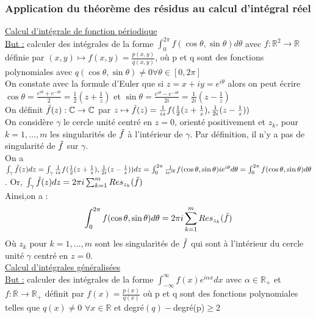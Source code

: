 \documentclass[../main.tex]{subfiles}
\begin{document}
\subsubsection{Application du théorème des résidus au calcul d'intégral réel}
\quad \underline{Calcul d'intégrale de fonction périodique}\\
\underline{But :} calculer des intégrales de la forme $\int_0^{2\pi} f(\cos{\theta}, \sin{\theta})d\theta$ avec $f:\mathbb{R}^2 \rightarrow \mathbb{R}$ définie par $(x,y) \mapsto f(x,y) = \frac{p(x,y)}{q(x,y)}$, où p et q sont des fonctions polynomiales avec $q(\cos{\theta}, \sin{\theta}) \neq 0 \forall \theta \in [0,2\pi]$\\

On constate avec la formule d'Euler que si $z= x+iy = e^{i\theta}$ alors on peut écrire $\cos{\theta} = \frac{e^{i\theta} + e^{-i\theta}}{2} = \frac{1}{2}(z+\frac{1}{z})$ et $\sin{\theta} = \frac{e^{i\theta} - e^{-i\theta}}{2i} = \frac{1}{2i}(z-\frac{1}{z})$\\
On définit $\Tilde{f}(z) : \mathbb{C} \rightarrow \mathbb{C}$ par $z\mapsto \Tilde{f}(z) = \frac{1}{iz} f(\frac{1}{2}(z+\frac{1}{z}), \frac{1}{2i}(z-\frac{1}{z}))$\\
On considère $\gamma$ le cercle unité centré en $z=0$, orienté positivement et $z_k$, pour $k=1,\dots, m$ les singularités de $\Tilde{f}$ à l'intérieur de $\gamma$. Par définition, il n'y a pas de singularité de $\Tilde{f}$ sur $\gamma$.\\

On a $\int_\gamma \Tilde{f}(z)dz = \int_\gamma \frac{1}{iz} f(\frac{1}{2}(z+\frac{1}{z}), \frac{1}{2i}(z-\frac{1}{z}))dz = \int_0^{2\pi} \frac{1}{ie^{i\theta}} f(\cos{\theta}, \sin{\theta}) i e^{i\theta}d\theta = \int_0^{2\pi}f(\cos{\theta}, \sin{\theta})d\theta$. Or, $\int_\gamma \Tilde{f}(z)dz = 2\pi i \sum_{k=1}^m Res_{z_k}(\Tilde{f})$\\

Ainsi,on a :\\
\begin{equation}
    \int_0^{2\pi} f(\cos{\theta}, \sin{\theta}) d\theta = 2\pi i \sum_{k=1}^m Res_{z_k} (\Tilde{f})
\end{equation}
Où $z_k$ pour $k=1,\dots, m$ sont les singularités de $\Tilde{f}$ qui sont à l'intérieur du cercle unité $\gamma$ centré en $z=0$.\\

\quad \underline{Calcul d'intégrales généralisées} \\
\underline{But :} calculer des intégrales de la forme $\int_{-\infty}^\infty f(x) e^{i\alpha x}dx$ avec $\alpha \in \mathbb{R}_+$ et $f: \mathbb{R} \rightarrow \mathbb{R}_+$ définit par $f(x) = \frac{p(x)}{q(x)}$ où p et q sont des fonctions polynomiales telles que $q(x) \neq 0$ $\forall x \in \mathbb{R}$ et degré$(q)-$degré(p)$\geq 2$\\
\end{document}
